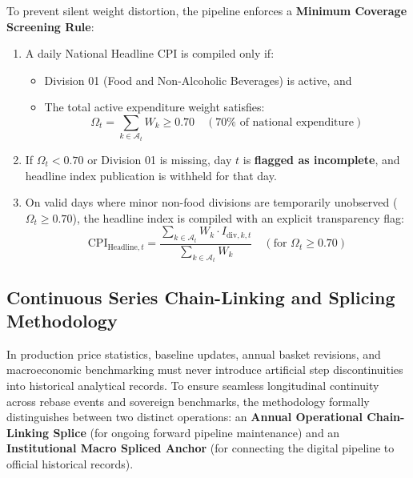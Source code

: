 To prevent silent weight distortion, the pipeline enforces a \textbf{Minimum Coverage Screening Rule}:
\begin{enumerate}
    \item A daily National Headline CPI is compiled only if:
    \begin{itemize}
        \item Division 01 (Food and Non-Alcoholic Beverages) is active, and
        \item The total active expenditure weight satisfies:
        \begin{equation}
            \Omega_t = \sum_{k \in \mathcal{A}_t} W_k \ge 0.70 \quad (70\% \text{ of national expenditure})
        \end{equation}
    \end{itemize}
    \item If $\Omega_t < 0.70$ or Division 01 is missing, day $t$ is \textbf{flagged as incomplete}, and headline index publication is withheld for that day.
    \item On valid days where minor non-food divisions are temporarily unobserved ($\Omega_t \ge 0.70$), the headline index is compiled with an explicit transparency flag:
    \begin{equation}
        \text{CPI}_{\text{Headline}, t} = \frac{\sum_{k \in \mathcal{A}_t} W_k \cdot I_{\text{div}, k, t}}{\sum_{k \in \mathcal{A}_t} W_k} \quad (\text{for } \Omega_t \ge 0.70)
    \end{equation}
\end{enumerate}

\subsection{Continuous Series Chain-Linking and Splicing Methodology}
\hs In production price statistics, baseline updates, annual basket revisions, and macroeconomic benchmarking must never introduce artificial step discontinuities into historical analytical records. To ensure seamless longitudinal continuity across rebase events and sovereign benchmarks, the methodology formally distinguishes between two distinct operations: an \textbf{Annual Operational Chain-Linking Splice} (for ongoing forward pipeline maintenance) and an \textbf{Institutional Macro Spliced Anchor} (for connecting the digital pipeline to official historical records).

